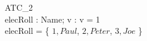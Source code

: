 \begin{schema}{ATC\_2}\\
 elecRoll : \power \nat \cross Name;
 v : \nat
\where
 v = 1 \\
 elecRoll = \{ \(1, Paul\), \(2, Peter\), \(3, Joe\) \} \\
\end{schema}
